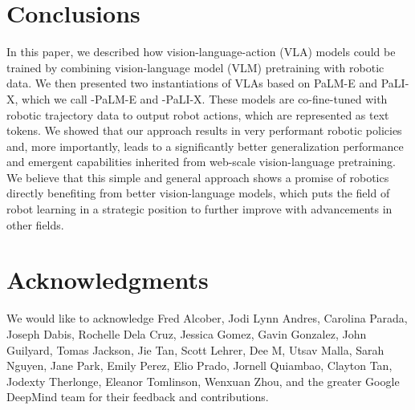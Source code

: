 \section{Conclusions}
\label{sec:conclusions}

In this paper, we described how vision-language-action (VLA) models could be trained by combining vision-language model (VLM) pretraining with robotic data. We then presented two instantiations of VLAs based on PaLM-E and PaLI-X, which we call \methodname-PaLM-E and \methodname-PaLI-X. These models are co-fine-tuned with robotic trajectory data to output robot actions, which are represented as text tokens. We showed that our approach results in very performant robotic policies and, more importantly, leads to a significantly better generalization performance and emergent capabilities inherited from web-scale vision-language pretraining. We believe that this simple and general approach shows a promise of robotics directly benefiting from better vision-language models, which puts the field of robot learning in a strategic position to further improve with advancements in other fields.

\section*{Acknowledgments}
We would like to acknowledge Fred Alcober, Jodi Lynn Andres, Carolina Parada, Joseph Dabis, Rochelle Dela Cruz, Jessica Gomez, Gavin Gonzalez, John Guilyard, Tomas Jackson, Jie Tan, Scott Lehrer, Dee M, Utsav Malla, Sarah Nguyen, Jane Park, Emily Perez, Elio Prado, Jornell Quiambao, Clayton Tan, Jodexty Therlonge, Eleanor Tomlinson, Wenxuan Zhou, and the greater Google DeepMind team for their feedback and contributions.

\clearpage

\clearpage

